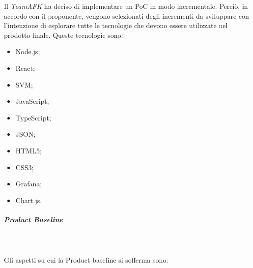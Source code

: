 			Il \textit{TeamAFK} ha deciso di implementare un PoC in modo incrementale. Perciò, in accordo con il proponente, vengono selezionati degli incrementi da sviluppare con l’intenzione di esplorare tutte le tecnologie che devono essere utilizzate nel prodotto finale. Queste tecnologie sono: \begin{itemize}
			\item Node.js;
			\item React;
			\item SVM;
			\item JavaScript;
			\item TypeScript;
			\item JSON;
			\item HTML5;
			\item CSS3;
			\item Grafana;
			\item Chart.js.
\end{itemize}
			\subparagraph*{Product Baseline} \mbox{} \\ \mbox{} \\
			Gli aspetti su cui la  Product baseline si sofferma sono:
